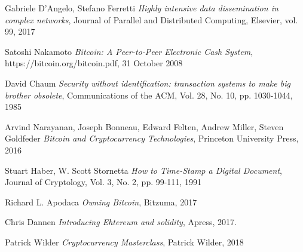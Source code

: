 \begin{thebibliography}{99}

 Gabriele D'Angelo, Stefano Ferretti
{\em Highly intensive data dissemination in complex networks},
Journal of Parallel and Distributed Computing, Elsevier, vol. 99, 2017

 Satoshi Nakamoto
{\em Bitcoin: A Peer-to-Peer Electronic Cash System},
https://bitcoin.org/bitcoin.pdf, 31 October 2008

 David Chaum
{\em Security without identification: transaction systems to make big brother obsolete},
Communications of the ACM, Vol. 28, No. 10, pp. 1030-1044, 1985

 Arvind Narayanan, Joseph Bonneau, Edward Felten, Andrew Miller, Steven Goldfeder
{\em Bitcoin and Cryptocurrency Technologies},
Princeton University Press, 2016

 Stuart Haber, W. Scott Stornetta
{\em How to Time-Stamp a Digital Document},
Journal of Cryptology, Vol. 3, No. 2, pp. 99-111, 1991

 Richard L. Apodaca
{\em Owning Bitcoin},
Bitzuma, 2017

 Chris Dannen
{\em Introducing Ehtereum and solidity},
Apress, 2017.

 Patrick Wilder
{\em Cryptocurrency Masterclass},
Patrick Wilder, 2018

\end{thebibliography}
